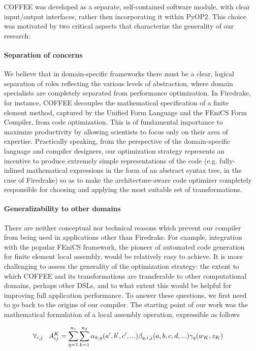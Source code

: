 COFFEE was developed as a separate, self-contained software module, with clear input/output interfaces, rather then incorporating it within PyOP2. This choice was motivated by two critical aspects that characterize the generality of our research:

\paragraph{Separation of concerns} We believe that in domain-specific frameworks there must be a clear, logical separation of roles reflecting the various levels of abstraction, where domain specialists are completely separated from performance optimization. In Firedrake, for instance, COFFEE decouples the mathematical specification of a finite element method, captured by the Unified Form Language and the FEniCS Form Compiler, from code optimization. This is of fundamental importance to maximize productivity by allowing scientists to focus only on their area of expertise. Practically speaking, from the perspective of the domain-specific language and compiler designers, our optimization strategy represents an incentive to produce extremely simple representations of the code (e.g. fully-inlined mathematical expressions in the form of an abstract syntax tree, in the case of Firedrake) so as to make the architecture-aware code optimizer completely responsible for choosing and applying the most suitable set of transformations.

\paragraph{Generalizability to other domains} There are neither conceptual nor technical reasons which prevent our compiler from being used in applications other than Firedrake. For example, integration with the popular FEniCS framework, the pioneer of automated code generation for finite element local assembly, would be relatively easy to achieve. It is more challenging to assess the generality of the optimization strategy: the extent to which COFFEE and its transformations are transferable to other computational domains, perhaps other DSLs, and to what extent this would be helpful for improving full application performance. To answer these questions, we first need to go back to the origins of our compiler. The starting point of our work was the mathematical formulation of a local assembly operation, expressible as follows

\begin{equation}
\label{eq:assembly-model}
\scriptsize
\forall_{i, j} ~~~ A_{ij}^K = \sum_{q=1}^{n_1} \sum_{k=1}^{n_2} \alpha_{k, q}(a', b', c', ...) \beta_{q, i, j}(a, b, c, d, ...) \gamma_{q}(w_K, z_K)
\end{equation}

